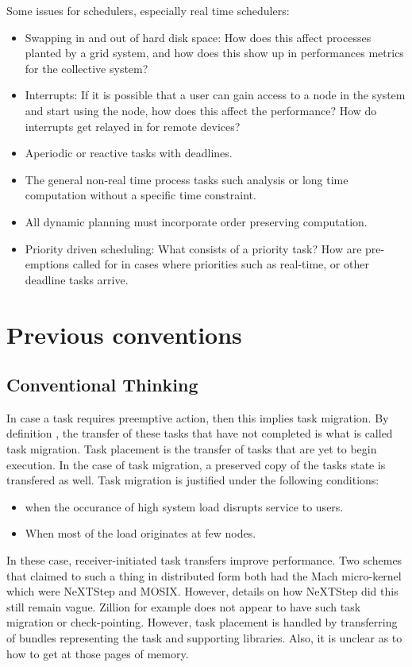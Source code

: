 \documentclass[11pt]{article}
\begin{document}
Some issues for schedulers, especially real time schedulers:
\begin{itemize}
\item Swapping in and out of hard disk space:  How does this affect processes planted by a grid system, and how does this show up in performances metrics for the collective system?
\item Interrupts:  If it is possible that a user can gain access to a node in the system and start using the node, how does this affect the performance?  How do interrupts get relayed in for remote devices?
\item Aperiodic or reactive tasks with deadlines.
\item The general non-real time process tasks such analysis or long time computation without a specific time constraint.  
\item All dynamic planning must incorporate order preserving computation.  
\item Priority driven scheduling:  What consists of a priority task?  How are pre-emptions called for in cases where priorities such as real-time, or other deadline tasks arrive.
\end{itemize}

\section {Previous conventions}

\subsection {Conventional Thinking}
In case a task requires preemptive action, then this implies task migration.  By definition \cite{Shiverati}, the transfer of these tasks that have not completed is what is called task migration.  Task placement is the transfer of tasks that are yet to begin execution.  In the case of task migration, a preserved copy of the tasks state is transfered as well.   Task migration is justified under the following conditions:
\begin{itemize}
\item when the occurance of high system load disrupts service to users.
\item When most of the load originates at few nodes.  
\end{itemize}
In these case, receiver-initiated task transfers improve performance.  Two schemes that claimed to such a thing in distributed form both had the Mach micro-kernel which were NeXTStep and MOSIX.    However, details on how NeXTStep did this still remain vague.  Zillion for example does not appear to have such task migration or check-pointing.   However, task placement is handled by transferring of bundles representing the task and supporting libraries.    Also, it is unclear as to how to get at those pages of memory.  
\end{document}
